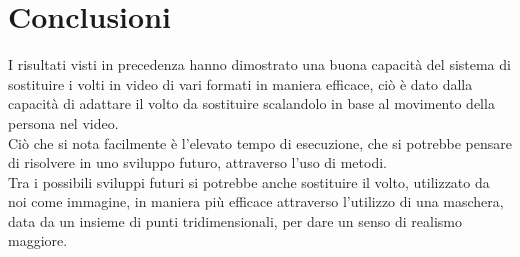 \documentclass{report}
\begin{document}
\chapter{Conclusioni}
I risultati visti in precedenza hanno dimostrato una buona capacità del sistema di sostituire i volti in video di vari formati in maniera efficace, ciò è dato dalla capacità di adattare il volto da sostituire scalandolo in base al movimento della persona nel video. \\
Ciò che si nota facilmente è l’elevato tempo di esecuzione, che si potrebbe pensare di risolvere in uno sviluppo futuro, attraverso l’uso di metodi. \\
Tra i possibili sviluppi futuri si potrebbe anche sostituire il volto, utilizzato da noi come immagine, in maniera più efficace attraverso l’utilizzo di una maschera, data da un insieme di punti tridimensionali, per dare un senso di realismo maggiore.
\end{document}
